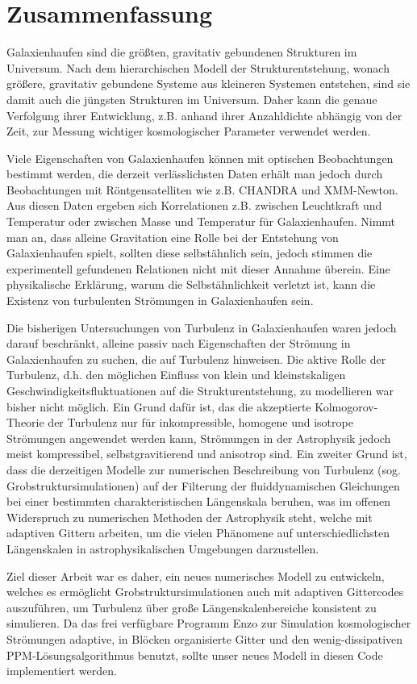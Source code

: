 \chapter*{Zusammenfassung}
Galaxienhaufen sind die größten, gravitativ gebundenen Strukturen im Universum.
Nach dem hierarchischen Modell der Strukturentstehung, wonach größere,
gravitativ gebundene Systeme aus kleineren Systemen entstehen, sind sie damit
auch die jüngsten Strukturen im Universum. Daher kann die genaue Verfolgung
ihrer Entwicklung, z.B. anhand ihrer Anzahldichte abhängig von der Zeit, zur
Messung wichtiger kosmologischer Parameter verwendet werden. 

Viele Eigenschaften von Galaxienhaufen können mit optischen Beobachtungen
bestimmt werden, die derzeit verlässlichsten Daten erhält man jedoch durch
Beobachtungen mit Röntgensatelliten wie z.B. CHANDRA und XMM-Newton. Aus diesen
Daten ergeben sich Korrelationen z.B. zwischen Leuchtkraft und Temperatur oder 
zwischen Masse und Temperatur für Galaxienhaufen. Nimmt man an, dass alleine 
Gravitation eine Rolle bei der Entstehung von Galaxienhaufen spielt, sollten
diese selbstähnlich sein, jedoch stimmen die experimentell gefundenen
Relationen nicht mit dieser Annahme überein. Eine physikalische Erklärung,
warum die Selbstähnlichkeit verletzt ist, kann die Existenz von turbulenten
Strömungen in Galaxienhaufen sein.

Die bisherigen Untersuchungen von Turbulenz in Galaxienhaufen waren jedoch
darauf beschränkt, alleine passiv nach Eigenschaften der Strömung in
Galaxienhaufen zu suchen, die auf Turbulenz hinweisen. Die aktive Rolle der
Turbulenz, d.h. den möglichen Einfluss von klein und kleinstskaligen
Geschwindigkeitsfluktuationen auf die Strukturentstehung, zu modellieren war
bisher nicht möglich. Ein Grund dafür ist, das die akzeptierte
Kolmogorov-Theorie der Turbulenz nur für inkompressible, homogene und isotrope
Strömungen angewendet werden kann, Strömungen in der Astrophysik jedoch meist
kompressibel, selbstgravitierend und anisotrop sind. Ein zweiter Grund ist,
dass die derzeitigen Modelle zur numerischen
Beschreibung von Turbulenz (sog. Grobstruktursimulationen) auf der Filterung der
fluiddynamischen Gleichungen bei einer bestimmten charakteristischen Längenskala
beruhen, was im offenen Widerspruch zu numerischen Methoden der
Astrophysik steht, welche mit adaptiven Gittern arbeiten, um die vielen
Phänomene auf unterschiedlichsten Längenskalen in astrophysikalischen
Umgebungen darzustellen.

Ziel dieser Arbeit war es daher, ein neues numerisches Modell zu
entwickeln, welches es ermöglicht Grobstruktursimulationen auch mit adaptiven
Gittercodes auszuführen, um Turbulenz über große Längenskalenbereiche konsistent
zu simulieren. Da das frei verfügbare Programm Enzo zur Simulation
kosmologischer Strömungen adaptive, in Blöcken organisierte Gitter und den
wenig-dissipativen PPM-Lösungsalgorithmus benutzt, sollte unser neues Modell in
diesen Code implementiert werden. 

